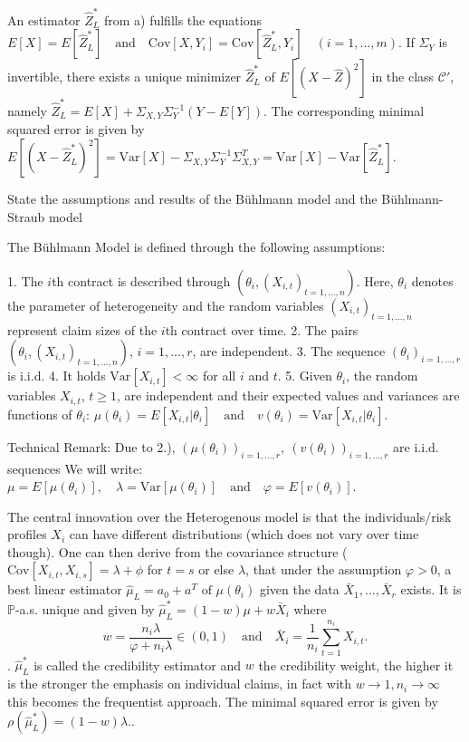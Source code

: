 An estimator \(\hat{Z}_L^{\ast}\) from a) fulfills the equations
\(
E[X] = E[\hat{Z}_L^{\ast}] \quad \text{and} \quad \text{Cov}[X, Y_i] = \text{Cov}[\hat{Z}_L^{\ast}, Y_i] \quad (i = 1, ..., m).
\)
If \(\Sigma_Y\) is invertible, there exists a unique minimizer \(\hat{Z}_L^{\ast}\) of \(E[(X - \hat{Z})^2]\) in the class \(\mathcal{C}'\), namely
\(
\hat{Z}_L^{\ast} = E[X] + \Sigma_{X,Y} \Sigma_Y^{-1} (Y - E[Y]).
\)
The corresponding minimal squared error is given by
\(
E[(X - \hat{Z}_L^{\ast})^2] = \text{Var}[X] - \Sigma_{X,Y} \Sigma_Y^{-1} \Sigma_{X,Y}^T = \text{Var}[X] - \text{Var}[\hat{Z}_L^{\ast}].
\)

State the assumptions and results of the Bühlmann model
and the Bühlmann-Straub model

The Bühlmann Model is defined through the following assumptions:

1. The \(i\)th contract is described through \((\theta_i, (X_{i,t})_{t=1,...,n})\). Here, \(\theta_i\) denotes the 
parameter of heterogeneity and the random variables \((X_{i,t})_{t=1,...,n}\) represent claim sizes of the \(i\)th contract over time.
2. The pairs \((\theta_i, (X_{i,t})_{t=1,...,n})\), \(i = 1, ..., r\), are independent.
3. The sequence \((\theta_i)_{i=1,...,r}\) is i.i.d.
4. It holds \(\text{Var}[X_{i,t}] < \infty\) for all \(i\) and \(t\).
5. Given \(\theta_i\), the random variables \(X_{i,t}\), \(t \ge 1\), are independent and their expected values and variances are functions of 
\(\theta_i\):
\(
\mu(\theta_i) = E[X_{i,t} | \theta_i] \quad \text{and} \quad v(\theta_i) = \text{Var}[X_{i,t} | \theta_i].
\)

Technical Remark:
Due to 2.), \((\mu(\theta_i))_{i=1,...,r},\ (v(\theta_i))_{i=1,...,r}\) are i.i.d. sequences
We will write:
\(
\mu = E[\mu(\theta_i)], \quad \lambda = \text{Var}[\mu(\theta_i)] \quad \text{and} \quad \varphi = E[v(\theta_i)].
\)

The central innovation over the Heterogenous model is that the individuals/risk profiles \( X_i \) can have different distributions
(which does not vary over time though).
One can then derive from the covariance structure (\( \text{Cov}[X_{i,t}, X_{i, s}] = \lambda + \phi \) for \( t = s \) or else \( \lambda \),
that under the assumption \(\varphi > 0\), a best linear estimator \(\hat{\mu}_L = a_0 + a^T \text{ of } \mu(\theta_i)\) given the data 
\(\bar{X}_1, ..., \bar{X}_r\) exists. It is \(\mathbb{P}\)-a.s. unique and given by
\(
\hat{\mu}_L^{\ast} = (1 - w) \mu + w \bar{X}_i
\)
where
\[
w = \frac{n_i \lambda}{\varphi + n_i \lambda} \in (0, 1) \quad \text{and} \quad \bar{X}_i = \frac{1}{n_i} \sum_{t=1}^{n_i} X_{i,t}.
\]. \(\hat{\mu}_L^{\ast}\) is called the credibility estimator and \( w \) the credibility weight, 
the higher it is the stronger the emphasis on individual claims, 
in fact with \( w \to 1, n_i \to \infty \) this becomes the frequentist approach.
The minimal squared error is given by
\(
\rho(\hat{\mu}_L^{\ast}) = (1 - w) \lambda.
\).

